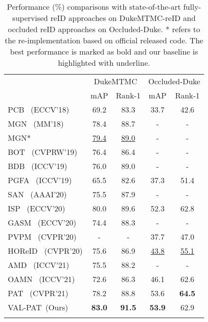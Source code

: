 \documentclass[final]{cvpr}
\begin{document}
\begin{table}[t]
\small
\centering
\setlength{\tabcolsep}{1.5mm}
\begin{tabular}{l|cc|cc}
\shline
    \multirow{2}{*}{Methods} & \multicolumn{2}{c|}{DukeMTMC} & \multicolumn{2}{c}{Occluded-Duke} \\
    \cline{2-5} & mAP & Rank-1 & mAP & Rank-1 \\ 
    \hline
PCB~\cite{sun2018beyond} (ECCV'18) & 69.2 & 83.3 & 33.7 & 42.6 \\
MGN~\cite{wang2018learning} (MM'18) & 78.4 & 88.7 & - & - \\
    MGN*        & \underline{79.4} & \underline{89.0} & - & - \\
    BOT~\cite{luo2019bag} (CVPRW'19) & 76.4 & 86.4 & - & - \\
BDB~\cite{dai2019batch} (ICCV'19) & 76.0 & 89.0 & - & - \\
PGFA~\cite{miao2019pose} (ICCV'19) & 65.5 & 82.6 & 37.3 & 51.4 \\
SAN~\cite{jin2020semantics} (AAAI'20) & 75.5 & 87.9 & - & - \\
    ISP~\cite{zhu2020identity} (ECCV'20) & 80.0 & 89.6 & 52.3 & 62.8 \\
    GASM~\cite{he2020guided} (ECCV'20) & 74.4 & 88.3 & - & - \\
    PVPM~\cite{gao2020pose} (CVPR'20) & - & - & 37.7 & 47.0 \\
    HOReID~\cite{wang2020high} (CVPR'20) & 75.6 & 86.9 &  \underline{43.8} & \underline{55.1} \\
AMD~\cite{chen2021explainable} (ICCV'21) & 75.5 & 88.2 & - & - \\
    OAMN~\cite{chen2021occlude} (ICCV'21) & 72.6 & 86.3 & 46.1 & 62.6 \\
    PAT~\cite{li2021diverse} (CVPR'21) & 78.2 & 88.8 & 53.6 & \textbf{64.5} \\
\hline
    VAL-PAT~(Ours) & \textbf{83.0} & \textbf{91.5} & \textbf{53.9} & 62.9 \\
    \shline
\end{tabular}\\
\vspace{-1mm}
\caption{Performance (\%) comparisons with state-of-the-art fully-supervised reID approaches on DukeMTMC-reID and occluded reID approaches on Occluded-Duke.
* refers to the re-implementation based on official released code.
The best performance is marked as bold and our baseline is highlighted with underline.}
\vspace{-2mm}
\label{tab4}
\end{table}
\end{document}
